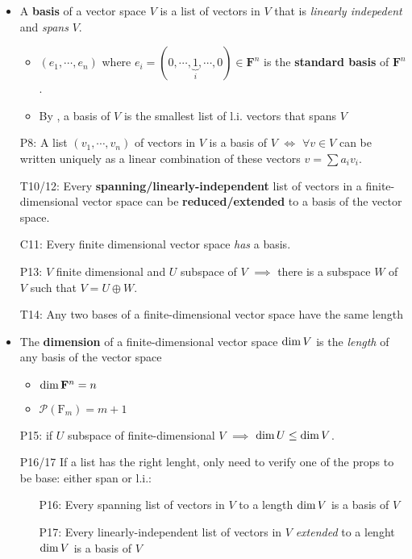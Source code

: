\begin{itemize}
\item A \textbf{basis} of a vector space $V$ is a list of vectors in $V$ that is \emph{linearly indepedent} and \emph{spans} $V$.
\begin{itemize}
\item $(e_1, \cdots, e_n)$ where $e_i=(0,\cdots, \underbrace{1}_{i},\cdots,0)\in\mathbf{F}^n$ is the \textbf{standard basis} of $\mathbf{F}^n$. 
\item By , a basis of $V$ is the smallest list of l.i. vectors that spans $V$
\end{itemize}
\item[P8:] A list $(v_1,\cdots,v_n)$ of vectors in $V$ is a basis of $V$ $\iff$ $\forall v\in V$ can be written uniquely as a linear combination of these vectors $v=\sum a_i v_i$.
\item[T10/12:] Every \textbf{spanning/linearly-independent}  list of vectors in a finite-dimensional vector space can be \textbf{reduced/extended} to a basis of the vector space.
\item[C11:] Every finite dimensional vector space \emph{has} a basis.
\item[P13:\label{itm:P2_13}] $V$ finite dimensional and $U$ subspace of $V$ $\implies$ there is a subspace $W$ of $V$ such that $V=U\oplus W$.
%
\item[T14:] Any two bases of a finite-dimensional vector space have the same length
\item The \textbf{dimension} of a finite-dimensional vector space $\operatorname{dim}{V}$ is the \emph{length} of any basis of the vector space
\begin{itemize}
  \item $\operatorname{dim}{\mathbf{F}^n} = n$
  \item $\mathcal{P}(\mathrm{F}_m) = m+1$
\end{itemize}
\item[P15:] if $U$  subspace of finite-dimensional $V$ $\implies$ $\operatorname{dim}{U}\leq\operatorname{dim}{V}$.
%
\item[P16/17] If a list has the right lenght, only need to verify one of the props to be base: either span or l.i.:
\begin{itemize}
  \item[P16:\label{it:T2_16}]Every spanning list of vectors in $V$  to a length $\operatorname{dim}{V}$ is a basis of $V$ 
  \item[P17:\label{it:T2_17}]Every linearly-independent list of vectors in $V$ \emph{extended} to a lenght $\operatorname{dim}{V}$ is a basis of $V$

\end{itemize}
\end{itemize}
